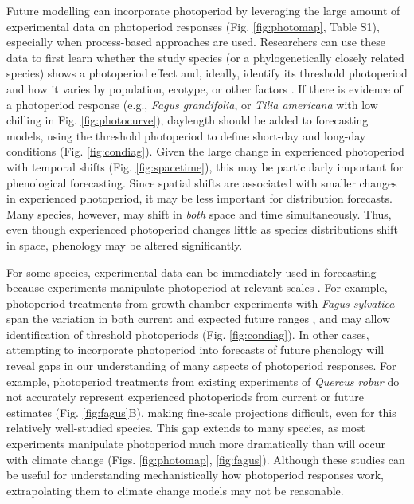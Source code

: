 \documentclass{article}
\begin{document}
\par Future modelling can incorporate photoperiod by leveraging the large amount of experimental data on photoperiod responses (Fig. \ref{fig:photomap}, Table S1), especially when process-based approaches are used. Researchers can use these data to first learn whether the study species (or a phylogenetically closely related species) shows a photoperiod effect and, ideally, identify its threshold photoperiod and how it varies by population, ecotype, or other factors \citep{bradshaw2006,gwinner1996,tobin2008}. If there is evidence of a photoperiod response (e.g., \emph{Fagus grandifolia}, or \emph{Tilia americana} with low chilling in Fig. \ref {fig:photocurve}), daylength should be added to forecasting models, using the threshold photoperiod to define short-day and long-day conditions (Fig. \ref{fig:condiag}). Given the large change in experienced photoperiod with temporal shifts (Fig. \ref{fig:spacetime}), this may be particularly important for phenological forecasting. Since spatial shifts are associated with smaller changes in experienced photoperiod, it may be less important for distribution forecasts. Many species, however, may shift in \emph{both} space and time simultaneously. Thus, even though experienced photoperiod changes little as species distributions shift in space, phenology may be altered significantly.

\par For some species, experimental data can be immediately used in forecasting because experiments manipulate photoperiod at relevant scales \citep[e.g., ][Figs. \ref{fig:photomap}, \ref{fig:fagus} A, Table S1]{Basler:2014aa,Heide:2015aa}. For example, photoperiod treatments from growth chamber experiments with \emph{Fagus sylvatica} span the variation in both current and expected future ranges \citep[Fig. \ref{fig:fagus}A, ][]{duputie2015}, and may allow identification of threshold photoperiods (Fig. \ref{fig:condiag}). In other cases, attempting to incorporate photoperiod into forecasts of future phenology will reveal gaps in our understanding of many aspects of photoperiod responses. For example, photoperiod treatments from existing experiments of \emph{Quercus robur} do not accurately represent experienced photoperiods from current or future estimates (Fig. \ref{fig:fagus}B), making fine-scale projections difficult, even for this relatively well-studied species. This gap extends to many species, as most experiments manipulate photoperiod much more dramatically than will occur with climate change (Figs. \ref{fig:photomap}, \ref{fig:fagus}). Although these studies can be useful for understanding mechanistically how photoperiod responses work, extrapolating them to climate change models may not be reasonable. 
 
\end{document}
